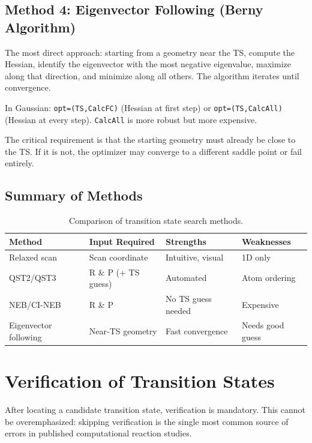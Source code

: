 \documentclass[11pt]{article}
\numberwithin{equation}{section}
\begin{document}
\subsection{Method 4: Eigenvector Following (Berny Algorithm)}

The most direct approach: starting from a geometry near the TS, compute the Hessian, identify the eigenvector with the most negative eigenvalue, maximize along that direction, and minimize along all others. The algorithm iterates until convergence.

In Gaussian: \texttt{opt=(TS,CalcFC)} (Hessian at first step) or \texttt{opt=(TS,CalcAll)} (Hessian at every step). \texttt{CalcAll} is more robust but more expensive.

The critical requirement is that the starting geometry must already be close to the TS. If it is not, the optimizer may converge to a different saddle point or fail entirely.

\subsection{Summary of Methods}

\begin{table}[h]
\centering
\caption{Comparison of transition state search methods.}
\label{tab:TS_methods}
\begin{tabular}{llll}
\toprule
\textbf{Method} & \textbf{Input Required} & \textbf{Strengths} & \textbf{Weaknesses} \\
\midrule
Relaxed scan & Scan coordinate & Intuitive, visual & 1D only \\
QST2/QST3 & R \& P (+ TS guess) & Automated & Atom ordering \\
NEB/CI-NEB & R \& P & No TS guess needed & Expensive \\
Eigenvector following & Near-TS geometry & Fast convergence & Needs good guess \\
\bottomrule
\end{tabular}
\end{table}


\section{Verification of Transition States}
\label{sec:verification}

After locating a candidate transition state, verification is mandatory. This cannot be overemphasized: skipping verification is the single most common source of errors in published computational reaction studies.
\end{document}

